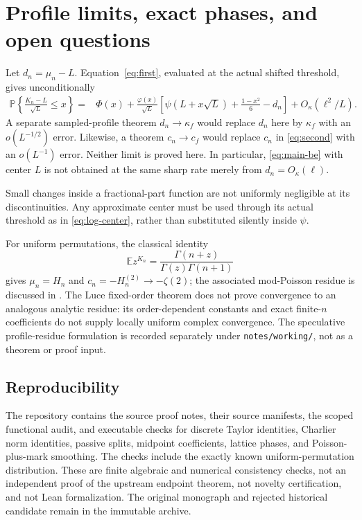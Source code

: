 \documentclass[11pt]{article}
\newcommand{\E}{\mathbb E}
\newcommand{\Pp}{\mathbb P}
\theoremstyle{remark}
\begin{document}
\section{Profile limits, exact phases, and open questions}\label{sec:open}
Let $d_n=\mu_n-L$. Equation~\eqref{eq:first}, evaluated at the actual shifted threshold, gives unconditionally
\begin{equation}\label{eq:log-center}
\begin{split}
 \Pp\left\{\frac{K_n-L}{\sqrt L}\le x\right\}
 ={}&\Phi(x)+\frac{\varphi(x)}{\sqrt L}
 \left[\psi(L+x\sqrt L)+\frac{1-x^2}{6}-d_n\right]
 +O_\kappa(\ell^2/L).
\end{split}
\end{equation}
A separate sampled-profile theorem $d_n\to\kappa_f$ would replace $d_n$ here by $\kappa_f$ with an $o(L^{-1/2})$ error. Likewise, a theorem $c_n\to c_f$ would replace $c_n$ in \eqref{eq:second} with an $o(L^{-1})$ error. Neither limit is proved here. In particular, \eqref{eq:main-be} with center $L$ is not obtained at the same sharp rate merely from $d_n=O_\kappa(\ell)$.

Small changes inside a fractional-part function are not uniformly negligible at its discontinuities. Any approximate center must be used through its actual threshold as in \eqref{eq:log-center}, rather than substituted silently inside $\psi$.

For uniform permutations, the classical identity
\[
 \E z^{K_n}=\frac{\Gamma(n+z)}{\Gamma(z)\Gamma(n+1)}
\]
gives $\mu_n=H_n$ and $c_n=-H_n^{(2)}\to-\zeta(2)$; the associated mod-Poisson residue is discussed in \cite{KN}. The Luce fixed-order theorem does not prove convergence to an analogous analytic residue: its order-dependent constants and exact finite-$n$ coefficients do not supply locally uniform complex convergence. The speculative profile-residue formulation is recorded separately under \texttt{notes/working/}, not as a theorem or proof input.

\subsection*{Reproducibility}
The repository contains the source proof notes, their source manifests, the scoped functional audit, and executable checks for discrete Taylor identities, Charlier norm identities, passive splits, midpoint coefficients, lattice phases, and Poisson-plus-mark smoothing. The checks include the exactly known uniform-permutation distribution. These are finite algebraic and numerical consistency checks, not an independent proof of the upstream endpoint theorem, not novelty certification, and not Lean formalization. The original monograph and rejected historical candidate remain in the immutable archive.
\end{document}
